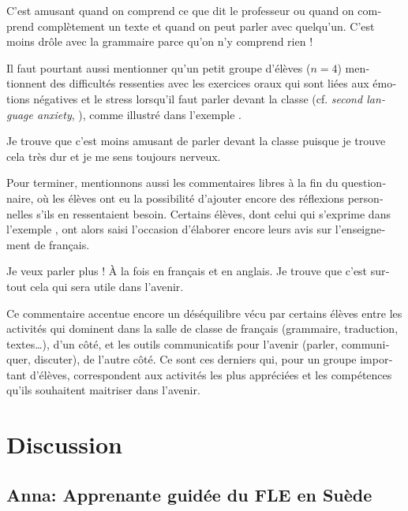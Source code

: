 \documentclass[french, output=paper]{langscibook}
\begin{document}
\begin{otherlanguage}{french}
\ea%
    \label{ex:granfeldt:12}
    C’est amusant quand on comprend ce que dit le professeur ou quand on comprend complètement un texte et quand on peut parler avec quelqu’un. C’est moins drôle avec la grammaire parce qu’on n’y comprend rien !
\z

Il faut pourtant aussi mentionner qu’un petit groupe d’élèves ($n=4$) mentionnent des difficultés ressenties avec les exercices oraux qui sont liées aux émotions négatives et le stress lorsqu’il faut parler devant la classe (cf. \textit{second language anxiety}, \citealt{HorwitzEtAl1986}), comme illustré dans l’exemple .

\ea%
    \label{ex:granfeldt:13}
    Je trouve que c’est moins amusant de parler devant la classe puisque je trouve cela très dur et je me sens toujours nerveux.
\z

Pour terminer, mentionnons aussi les commentaires libres à la fin du questionnaire, où les élèves ont eu la possibilité d’ajouter encore des réflexions personnelles s’ils en ressentaient besoin. Certains élèves, dont celui qui s’exprime dans l’exemple , ont alors saisi l’occasion d’élaborer encore leurs avis sur l’enseignement de français. 

\ea%
    \label{ex:granfeldt:14}
    Je veux parler plus ! À la fois en français et en anglais. Je trouve que c’est surtout cela qui sera utile dans l’avenir. 
\z

\begin{sloppypar}
Ce commentaire accentue encore un déséquilibre vécu par certains élèves entre les activités qui dominent dans la salle de classe de français (grammaire, traduction, textes…), d’un côté, et les outils communicatifs pour l’avenir (parler, communiquer, discuter), de l’autre côté. Ce sont ces derniers qui, pour un groupe important d’élèves, correspondent aux activités les plus appréciées et les compétences qu’ils souhaitent maitriser dans l’avenir.
\end{sloppypar}

\section{Discussion}\label{sec:granfeldt:6}

\subsection{Anna: Apprenante guidée du FLE en Suède}\label{sec:granfeldt:6.1}


\end{otherlanguage}
\end{document}
